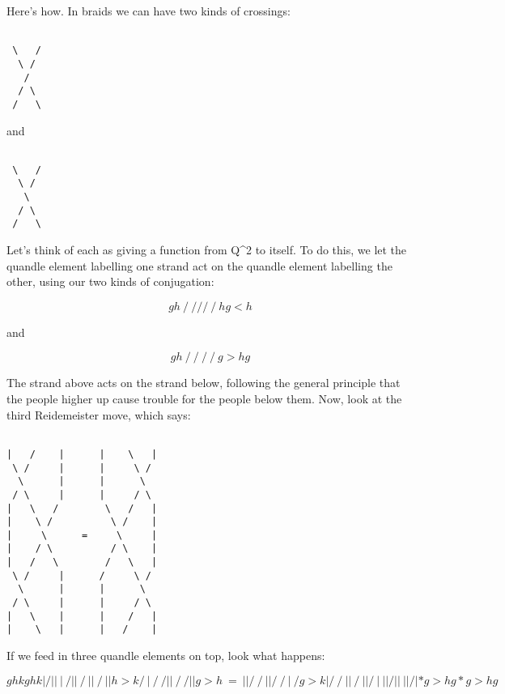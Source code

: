 Here's how.  In braids we can have two kinds of crossings:


\begin{verbatim}

 \   /
  \ /
   /
  / \
 /   \
\end{verbatim}
    

and


\begin{verbatim}

 \   /
  \ /
   \
  / \
 /   \
\end{verbatim}
    

Let's think of each as giving a function from Q^{2} to itself.  To
do this, we let the quandle element labelling one strand act on the 
quandle element labelling the other, using our two kinds of 
conjugation:


$$

g     h
 \   /
  \ /
   /
  / \
 /   \
h    g<h
$$
    
and


$$

g     h
 \   /
  \ /
   \
  / \
 /   \
g>h   g
$$
    

The strand above acts on the strand below, following the general
principle that the people higher up cause trouble for the people below
them.  Now, look at the third Reidemeister move, which says:


\begin{verbatim}

|   /    |      |    \   |
 \ /     |      |     \ / 
  \      |      |      \
 / \     |      |     / \
|   \   /        \   /   |
|    \ /          \ /    |
|     \      =     \     |	
|    / \          / \    |
|   /   \        /   \   |
 \ /     |      /     \ / 
  \      |      |      \  
 / \     |      |     / \ 
|   \    |      |    /   |
|    \   |      |   /    |
\end{verbatim}
    

If we feed in three quandle elements on top, look what happens:


$$

g    h   k      g   h    k
|   /    |      |    \   |
 \ /     |      |     \ / 
  \      |      |      \
 / \     |      |  h>k/ \
|   \   /        \   /   |
|    \ /          \ /    |
|g>h  \      =     \     |	
|    / \          / \    |
|   /   \        /   \   |
 \ /g>k  |      /     \ / 
  \      |      |      \  
 / \     |      |     / \ 
|   \    |      |    /   |
|    \   |      |   /    |
*   g>h  g      *  g>h   g
$$
    

